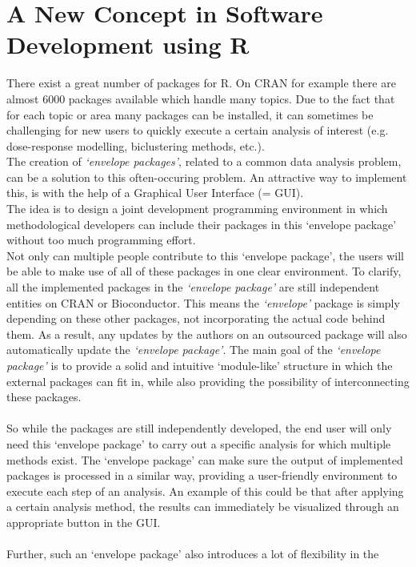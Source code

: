 \documentclass[a4paper]{article}\usepackage[]{graphicx}\usepackage[]{color}
\begin{document}
\section{A New Concept in Software Development using R}
\noindent There exist a great number of packages for R. On CRAN for example
there are almost 6000 packages available which handle many topics. 
Due to the fact that for each topic or area many packages can be installed, it
can sometimes be challenging for new users to quickly execute a certain
analysis of interest (e.g. dose-response modelling, biclustering
methods, etc.).\\
The creation of {\it `envelope packages'}, related to a common data analysis
problem, can be a solution to this often-occuring problem. 
An attractive way to implement this, is with the help of a Graphical User
Interface (= GUI).\\
The idea is to design a joint development programming environment in which
methodological developers can include their packages in this `envelope
package' without too much programming effort.\\
Not only can multiple people contribute to this `envelope package', the users
will be able to make use of all of these packages in one clear environment. 
To clarify, all the implemented packages in the {\it `envelope
package'} are still independent entities on CRAN or Bioconductor. This means the
{\it `envelope'} package is simply depending on these other packages, not
incorporating the actual code behind them. As a result, any updates by the
authors on an outsourced package will also automatically update the {\it
`envelope package'}. The main goal of the {\it `envelope package'} is to provide
a solid and intuitive `module-like' structure in which the external packages can
fit in, while also providing the possibility of interconnecting these packages.
\\ \\
So while the packages are still independently developed, the end user will only
need this `envelope package' to carry out a specific analysis for which multiple
methods exist. The `envelope package' can make sure the output of implemented
packages is processed in a similar way, providing a user-friendly environment to
execute each step of an analysis. An example of this could be that after
applying a certain analysis method, the results can immediately be visualized
through an appropriate button in the GUI. \\ \\
Further, such an `envelope package' also introduces a lot of flexibility in the
\end{document}
